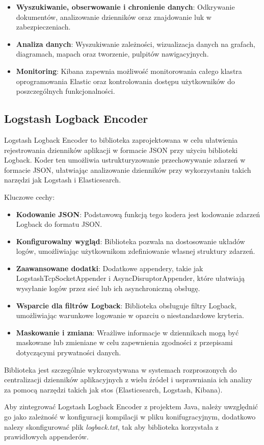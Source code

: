 \begin{itemize}
    \item \textbf{Wyszukiwanie, obserwowanie i chronienie danych}: Odkrywanie dokumentów,  analizowanie dzienników oraz znajdowanie luk w zabezpieczeniach\cite{kibanaOverview}.
    \item \textbf{Analiza danych}: Wyszukiwanie zależności, wizualizacja danych na grafach, diagramach, mapach oraz tworzenie, pulpitów nawigacyjnych\cite{kibanaOverview}.
    \item \textbf{Monitoring}: Kibana zapewnia możliwość monitorowania całego klastra oprogramowania Elastic oraz kontrolowania dostępu użytkowników do poszczególnych funkcjonalności\cite{kibanaOverview}.
\end{itemize}

\subsection{Logstash Logback Encoder}

Logstash Logback Encoder to biblioteka zaprojektowana w celu ułatwienia rejestrowania dzienników aplikacji w formacie JSON przy użyciu biblioteki Logback. Koder ten umożliwia ustrukturyzowanie przechowywanie zdarzeń w formacie JSON, ułatwiając analizowanie dzienników przy wykorzystaniu takich narzędzi jak Logstash i Elasticsearch. 

Kluczowe cechy:

\begin{itemize}
    \item \textbf{Kodowanie JSON}: Podstawową funkcją tego kodera jest kodowanie zdarzeń Logback do formatu JSON.
    \item \textbf{Konfigurowalny wygląd}: Biblioteka pozwala na dostosowanie układów logów, umożliwiając użytkownikom zdefiniowanie własnej struktury zdarzeń.
    \item \textbf{Zaawansowane dodatki}: Dodatkowe appendery, takie jak LogstashTcpSocketAppender i AsyncDisruptorAppender, które ułatwiają wysyłanie logów przez sieć lub ich asynchroniczną obsługę.
    \item \textbf{Wsparcie dla filtrów Logback}: Biblioteka obsługuje filtry Logback, umożliwiając warunkowe logowanie w oparciu o niestandardowe kryteria.
    \item \textbf{Maskowanie i zmiana}: Wrażliwe informacje w dziennikach mogą być maskowane lub zmieniane w celu zapewnienia zgodności z przepisami dotyczącymi prywatności danych.
\end{itemize}

Biblioteka jest szczególnie wykrozystywana w systemach rozproszonych do centralizacji dzienników aplikacyjnych z wielu źródeł i usprawniania ich analizy za pomocą narzędzi takich jak stos  (Elasticsearch, Logstash, Kibana).

Aby zintegrować Logstash Logback Encoder z projektem Java, należy uwzględnić go jako zależność w konfiguracji kompilacji w pliku konifugracyjnym, dodatkowo nalezy skonfigurować plik \textit{logback.txt}, tak aby biblioteka korzystała z prawidłowych appenderów.